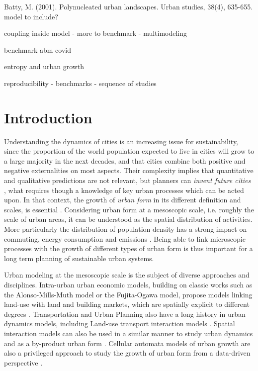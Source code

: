 \documentclass[10pt,letterpaper]{article}
\begin{document}
Batty, M. (2001). Polynucleated urban landscapes. Urban studies, 38(4), 635-655. model to include?

\cite{xu2021emergence}

\cite{strano2021agglomeration}

\cite{rybski2021comparing}

\cite{Rybski2021Modeling} coupling inside model - more to benchmark - multimodeling

\cite{bithellsystematic} benchmark abm covid

\cite{jun2020modling} entropy and urban growth


\cite{Nicholse2100769118} reproducibility - benchmarks - sequence of studies


\section*{Introduction}


Understanding the dynamics of cities is an increasing issue for sustainability, since the proportion of the world population expected to live in cities will grow to a large majority in the next decades, and that cities combine both positive and negative externalities on most aspects. Their complexity implies that quantitative and qualitative predictions are not relevant, but planners can \emph{invent future cities} \cite{batty2018inventing}, what requires though a knowledge of key urban processes which can be acted upon. In that context, the growth of \emph{urban form} in its different definition and scales, is essential \cite{williams2000achieving}. Considering urban form at a mesoscopic scale, i.e. roughly the scale of urban areas, it can be understood as the spatial distribution of activities. More particularly the distribution of population density has a strong impact on commuting, energy consumption and emissions \cite{le2012urban}. Being able to link microscopic processes with the growth of different types of urban form is thus important for a long term planning of sustainable urban systems.


Urban modeling at the mesoscopic scale is the subject of diverse approaches and disciplines. Intra-urban urban economic models, building on classic works such as the Alonso-Mills-Muth model or the Fujita-Ogawa model, propose models linking land-use with land and building markets, which are spatially explicit to different degrees \cite{viguie2012trade}. Transportation and Urban Planning also have a long history in urban dynamics models, including Land-use transport interaction models \cite{wegener2004land}. Spatial interaction models can also be used in a similar manner to study urban dynamics and as a by-product urban form \cite{milton2019accelerating}. Cellular automata models of urban growth are also a privileged approach to study the growth of urban form from a data-driven perspective \cite{batty1997cellular}.
\end{document}
